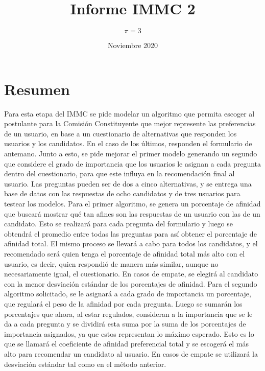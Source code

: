 \documentclass[a4paper]{article}
\title{Informe IMMC 2}
\author{$\pi = 3$}
\date{Noviembre 2020}
\begin{document}

\newpage
\tableofcontents
\newpage
\section{Resumen}
Para esta etapa del IMMC se pide modelar un algoritmo que permita escoger al postulante para la Comisión Constituyente que mejor represente las preferencias de un usuario, en base a un cuestionario de alternativas que responden los usuarios y los candidatos. En el caso de los últimos, responden el formulario de antemano. Junto a esto, se pide mejorar el primer modelo generando un segundo que considere el grado de importancia que los usuarios le asignan a cada pregunta dentro del cuestionario, para que este influya en la recomendación final al usuario. Las preguntas pueden ser de dos a cinco alternativas, y se entrega una base de datos con las respuestas de ocho candidatos y de tres usuarios para testear los modelos.  \newline \newline Para el primer algoritmo, se genera un porcentaje de afinidad que buscará mostrar qué tan afines son las respuestas de un usuario con las de un candidato. Esto se realizará para cada pregunta del formulario y luego se obtendrá el promedio entre todas las preguntas para así obtener el porcentaje de afinidad total. El mismo proceso se llevará a cabo para todos los candidatos, y el recomendado será quien tenga el porcentaje de afinidad total más alto con el usuario, es decir, quien respondió de manera más similar, aunque no necesariamente igual, el cuestionario. En casos de empate, se elegirá al candidato con la menor desviación estándar de los porcentajes de afinidad. \newline\newline Para el segundo algoritmo solicitado, se le asignará a cada grado de importancia un porcentaje, que regulará el peso de la afinidad por cada pregunta. Luego se sumarán los porcentajes que ahora, al estar regulados, consideran a la importancia que se le da a cada pregunta y se dividirá esta suma por la suma de los porcentajes de importancia asignados, ya que estos representan lo máximo esperado. Esto es lo que se llamará el coeficiente de afinidad preferencial total y se escogerá el más alto para recomendar un candidato al usuario. En casos de empate se utilizará la desviación estándar tal como en el método anterior. 
\newpage
\end{document}
